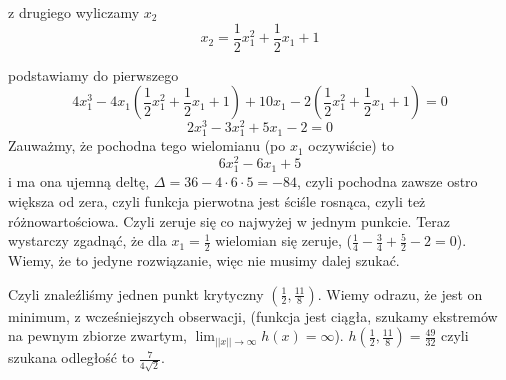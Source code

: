 \documentclass{article}
\begin{document}
z drugiego wyliczamy $x_2$
$$x_2 = \frac{1}{2}x_1^2 + \frac{1}{2}x_1 + 1 $$

podstawiamy do pierwszego
$$4x_1^3 - 4x_1\left(\frac{1}{2}x_1^2 + \frac{1}{2}x_1 + 1\right) + 10x_1 - 2\left(\frac{1}{2}x_1^2 + \frac{1}{2}x_1 + 1\right) = 0 $$
$$ 2x_1^3 - 3x_1^2 +5x_1 -2 = 0$$
Zauważmy, że pochodna tego wielomianu (po $x_1$ oczywiście) to
$$6x_1^2 - 6x_1 + 5$$ i ma ona ujemną deltę, $\Delta = 36 - 4\cdot6\cdot5 = -84$, czyli pochodna zawsze ostro większa od zera, czyli funkcja pierwotna jest ściśle rosnąca, czyli też różnowartościowa. Czyli zeruje się co najwyżej w jednym punkcie.\newline
Teraz wystarczy zgadnąć, że dla $x_1 = \frac{1}{2}$ wielomian się zeruje, ($\frac{1}{4} - \frac{3}{4} + \frac{5}{2} - 2 = 0$). Wiemy, że to jedyne rozwiązanie, więc nie musimy dalej szukać.

\newpage

Czyli znaleźliśmy jednen punkt krytyczny $(\frac{1}{2}, \frac{11}{8})$. Wiemy odrazu, że jest on minimum, z wcześniejszych obserwacji, (funkcja jest ciągła, szukamy ekstremów na pewnym zbiorze zwartym,  $\lim_{||x|| \to \infty} h(x) = \infty$).
$h(\frac{1}{2}, \frac{11}{8}) = \frac{49}{32}$ czyli szukana odległość to $\frac{7}{4\sqrt{2}}$.
\end{document}
